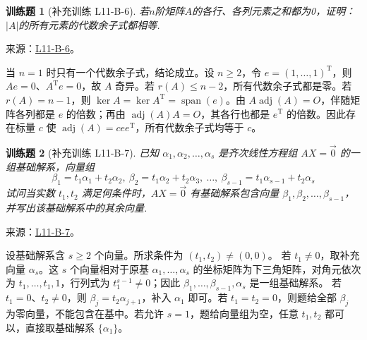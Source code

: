 \documentclass[UTF8,12pt,a4paper,fontset=fandol]{ctexart}
\newtheorem{exercise}{训练题}[section]
\begin{document}
\begin{exercise}[补充训练 L11-B-6]\label{prob:L11-B-6}
若$n$阶矩阵$A$的各行、各列元素之和都为0，证明：$|A|$的所有元素的代数余子式都相等.
\end{exercise}
\noindent 来源：\href{https://github.com/yhwu-is/Linear-Algebra-Left-Undone/blob/new/%E8%AE%B2%E4%B9%89/%E4%B8%93%E9%A2%98/11%20%E6%9C%9D%E8%8A%B1%E5%A4%95%E6%8B%BE.tex}{L11-B-6}。
\begin{solve}
当 $n=1$ 时只有一个代数余子式，结论成立。设 $n\ge2$，令 $e=(1,\ldots,1)^{\mathrm T}$，则 $Ae=0$、$A^{\mathrm T}e=0$，故 $A$ 奇异。若 $r(A)\le n-2$，所有代数余子式都是零。若 $r(A)=n-1$，则 $\ker A=\ker A^{\mathrm T}=\operatorname{span}(e)$。由 $A\operatorname{adj}(A)=O$，伴随矩阵各列都是 $e$ 的倍数；再由 $\operatorname{adj}(A)A=O$，其各行也都是 $e^{\mathrm T}$ 的倍数。因此存在标量 $c$ 使 $\operatorname{adj}(A)=cee^{\mathrm T}$，所有代数余子式均等于 $c$。
\end{solve}

\begin{exercise}[补充训练 L11-B-7]\label{prob:L11-B-7}
已知 $\alpha_1,\alpha_2,\ldots,\alpha_s$ 是齐次线性方程组 $AX=\vec{0}$ 的一组基础解系，向量组
        \[\beta_1=t_1\alpha_1+t_2\alpha_2,\ \beta_2=t_1\alpha_2+t_2\alpha_3,\ \ldots,\ \beta_{s-1}=t_1\alpha_{s-1}+t_2\alpha_s\]
        试问当实数 $t_1,t_2$ 满足何条件时，$AX=\vec{0}$ 有基础解系包含向量 $\beta_1,\beta_2,\ldots,\beta_{s-1}$，并写出该基础解系中的其余向量.
\end{exercise}
\noindent 来源：\href{https://github.com/yhwu-is/Linear-Algebra-Left-Undone/blob/new/%E8%AE%B2%E4%B9%89/%E4%B8%93%E9%A2%98/11%20%E6%9C%9D%E8%8A%B1%E5%A4%95%E6%8B%BE.tex}{L11-B-7}。
\begin{solve}
设基础解系含 $s\ge2$ 个向量。所求条件为 $(t_1,t_2)\ne(0,0)$。
若 $t_1\ne0$，取补充向量 $\alpha_s$。这 $s$ 个向量相对于原基 $\alpha_1,\ldots,\alpha_s$ 的坐标矩阵为下三角矩阵，对角元依次为 $t_1,\ldots,t_1,1$，行列式为 $t_1^{s-1}\ne0$；因此 $\beta_1,\ldots,\beta_{s-1},\alpha_s$ 是一组基础解系。
若 $t_1=0$、$t_2\ne0$，则 $\beta_j=t_2\alpha_{j+1}$，补入 $\alpha_1$ 即可。若 $t_1=t_2=0$，则题给全部 $\beta_j$ 为零向量，不能包含在基中。若允许 $s=1$，题给向量组为空，任意 $t_1,t_2$ 都可以，直接取基础解系 $\{\alpha_1\}$。
\end{solve}
\end{document}
